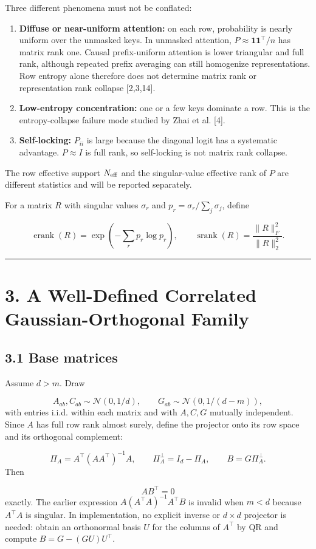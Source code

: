 \documentclass[11pt,letterpaper]{article}
\theoremstyle{definition}
\begin{document}
Three different phenomena must not be conflated:

\begin{enumerate}
  \item \textbf{Diffuse or near-uniform attention:} on each row, probability is nearly uniform over the unmasked keys. In unmasked attention, $P\approx\mathbf1\mathbf1^\top/n$ has matrix rank one. Causal prefix-uniform attention is lower triangular and full rank, although repeated prefix averaging can still homogenize representations. Row entropy alone therefore does not determine matrix rank or representation rank collapse [2,3,14].
  \item \textbf{Low-entropy concentration:} one or a few keys dominate a row. This is the entropy-collapse failure mode studied by Zhai et al. [4].
  \item \textbf{Self-locking:} $P_{ii}$ is large because the diagonal logit has a systematic advantage. $P\approx I$ is full rank, so self-locking is not matrix rank collapse.
\end{enumerate}
The row effective support $N_{\rm eff}$ and the singular-value effective rank of $P$ are different statistics and will be reported separately.

For a matrix $R$ with singular values $\sigma_r$ and $p_r=\sigma_r/\sum_j\sigma_j$, define

\[
\operatorname{erank}(R)=\exp\!\left(-\sum_r p_r\log p_r\right),\qquad
\operatorname{srank}(R)=\frac{\|R\|_F^2}{\|R\|_2^2}.
\]
\vspace{0.35em}\hrule\vspace{0.35em}
\section{3. A Well-Defined Correlated Gaussian-Orthogonal Family}
\subsection{3.1 Base matrices}
Assume $d>m$. Draw

\[
A_{ab},C_{ab}\sim\mathcal N(0,1/d),
\qquad G_{ab}\sim\mathcal N(0,1/(d-m)),
\]
with entries i.i.d. within each matrix and with $A,C,G$ mutually independent. Since $A$ has full row rank almost surely, define the projector onto its row space and its orthogonal complement:

\[
\Pi_A=A^\top(AA^\top)^{-1}A,\qquad
\Pi_A^\perp=I_d-\Pi_A,\qquad B=G\Pi_A^\perp.
\]
Then

\[
AB^\top=0
\]
exactly. The earlier expression $A(A^\top A)^{-1}A^\top B$ is invalid when $m<d$ because $A^\top A$ is singular. In implementation, no explicit inverse or $d\times d$ projector is needed: obtain an orthonormal basis $U$ for the columns of $A^\top$ by QR and compute $B=G-(GU)U^\top$.
\end{document}
